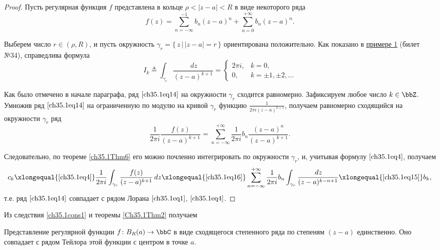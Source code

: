 \begin{proof}
Пусть регулярная функция $f$ представлена в кольце $\rho < |z - a| < R$ в виде некоторого ряда
\begin{equation} \label{ch35.1eq14}
f(z) = \sum_{n = -\infty}^{-1} b_n (z - a)^n + \sum_{n = 0}^{+\infty} b_n (z - a)^n.
\end{equation}

Выберем число $r \in (\rho, R)$, и пусть окружность $\gamma_r = \{\, z \,\big|\, |z - a| = r\,\}$ ориентирована положительно. Как показано в \hyperref[exmpl1]{примере 1} (билет №34), справедлива формула
\begin{equation} \label{ch35.1eq15}
I_k \triangleq \int_{\gamma_r} \frac{\,dz}{(z - a)^{k + 1}} = 
\begin{cases}
2\pi i, & k = 0, \\
0, & k = \pm1, \pm2, \ldots
\end{cases}
\end{equation}

Как было отмечено в начале параграфа, ряд $\eqref{ch35.1eq14}$ на окружности $\gamma_r$ сходится равномерно. Зафиксируем любое число $k \in \bbZ$. Умножив ряд $\eqref{ch35.1eq14}$ на ограниченную по модулю на кривой $\gamma_r$ функцию $\frac{1}{2\pi i(z - a)^{k + 1}}$, получаем равномерно сходящийся на окружности $\gamma_r$ ряд
\begin{equation} \label{ch35.1eq16}
\frac{1}{2\pi i} \frac{f(z)}{(z - a)^{k + 1}} = \sum_{n = -\infty}^{+\infty} \frac{1}{2\pi i} b_n \frac{(z-a)^n}{(z - a)^{k + 1}}.
\end{equation}

Следовательно, по теореме \ref{ch35.1Thm6} его можно почленно интегрировать по окружности $\gamma_r$, и, учитывая формулу $\eqref{ch35.1eq4}$, получаем
$$
c_k \xlongequal{\eqref{ch35.1eq4}} \frac{1}{2\pi i} \int_{\gamma_r} \frac{f(z)}{(z - a)^{k + 1}} \,dz \xlongequal{\eqref{ch35.1eq16}} \sum_{n = -\infty}^{+\infty} \frac{1}{2\pi i} b_n \int_{\gamma_r} \frac{\,dz}{(z - a)^{k - n + 1}} \xlongequal{\eqref{ch35.1eq15}} b_k,
$$
т.е. ряд $\eqref{ch35.1eq14}$ совпадает с рядом Лорана $\eqref{ch35.1eq1}$, $\eqref{ch35.1eq4}$.
\end{proof}

Из следствия \ref{ch35.1cons1} и теоремы \ref{Ch35.1Thm2} получаем

\begin{cons}
Представление регулярной функции $f \colon B_R(a) \to \bbC$ в виде сходящегося степенного ряда по степеням $(z - a)$ единственно. Оно совпадает с рядом Тейлора этой функции с центром в точке $a$.
\end{cons}


